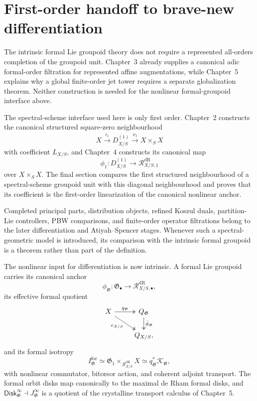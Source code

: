 \section{First-order handoff to brave-new differentiation}
\label{sec:flg-handoff}
\label{sec:flg-represented-interface}

The intrinsic formal Lie groupoid theory does not require a represented
all-orders completion of the groupoid unit.  Chapter~3 already supplies a
canonical adic formal-order filtration for represented affine augmentations,
while Chapter~5 explains why a global finite-order jet tower requires a
separate globalization theorem.  Neither construction is needed for the
nonlinear formal-groupoid interface above.

The spectral-scheme interface used here is only first order.  Chapter~2 constructs
the canonical structured square-zero neighbourhood
\[
    X\xrightarrow{i_1}D^{(1)}_{X/S}\xrightarrow{\nu_1}X\times_SX
\]
with coefficient $L_{X/S}$, and Chapter~4 constructs its canonical map
\[
    \phi_1:D^{(1)}_{X/S}\longrightarrow
    \mathcal R^{\mathrm{dR}}_{X/S,1}
\]
over $X\times_SX$.  The final section compares the first structured
neighbourhood of a spectral-scheme groupoid unit with this diagonal neighbourhood
and proves that its coefficient is the first-order linearization of the
canonical nonlinear anchor.

\begin{remark}
Completed principal parts, distribution objects, refined Koszul duals,
partition-Lie controllers, PBW comparisons, and finite-order operator
filtrations belong to the later differentiation and Atiyah--Spencer stages.
Whenever such a spectral-geometric model is introduced, its comparison with the
intrinsic formal groupoid is a theorem rather than part of the definition.
\end{remark}




The nonlinear input for differentiation is now intrinsic.  A formal Lie
groupoid carries its canonical anchor
\[
    \phi_{\mathfrak G}:
    \mathfrak G_\bullet\longrightarrow \mathcal R^{\mathrm{dR}}_{X/S,\bullet},
\]
its effective formal quotient
\[
\begin{tikzcd}
X \arrow[r,two heads,"q_{\mathfrak G}"]
  \arrow[dr,two heads,"e_{X/S}"'] &
Q_{\mathfrak G}
  \arrow[d,two heads,"\bar\phi_{\mathfrak G}"]\\
&Q_{X/S},
\end{tikzcd}
\]
and its formal isotropy
\[
    I^{\mathrm{for}}_{\mathfrak G}
    \simeq
    \mathfrak G_1\times_{\mathcal R^{\mathrm{dR}}_{X/S}}X
    \simeq
    q_{\mathfrak G}^*\mathcal K_{\mathfrak G},
\]
with nonlinear commutator, bitorsor action, and coherent adjoint transport.
The formal orbit disks map canonically to the maximal de Rham formal disks, and
$\mathsf{Disk}^{\infty}_{\mathfrak G}\dashv J^\infty_{\mathfrak G}$ is a quotient of
the crystalline transport calculus of Chapter~5.

